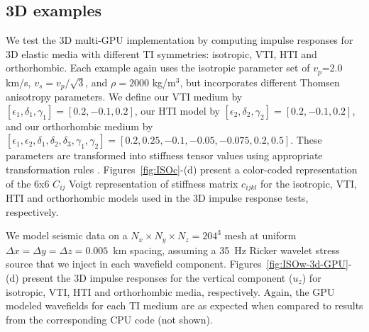 
\subsection{3D examples}

We test the 3D multi-GPU implementation by computing impulse responses for 3D elastic media with different TI symmetries: isotropic, VTI, HTI and orthorhombic.  Each example again uses the isotropic parameter set of $v_p$=2.0 km/s, $v_s=v_p/\sqrt{3}$, and $\rho=2000$ kg/m$^3$, but incorporates different Thomsen anisotropy parameters.  We define our VTI medium by $[\epsilon_1,\delta_1,\gamma_1]=[0.2,-0.1,0.2]$,  our HTI model by $[\epsilon_2,\delta_2,\gamma_2]=[0.2,-0.1,0.2]$, and our orthorhombic medium by $[\epsilon_1,\epsilon_2,\delta_1,\delta_2,\delta_3,\gamma_1,\gamma_2]=[0.2, 0.25,-0.1,-0.05,-0.075, 0.2, 0.5]$.  These parameters are transformed into stiffness tensor values using appropriate transformation rules \cite[]{Thomsen86}.  Figures~\ref{fig:ISOc}-(d) present a color-coded representation of the 6x6 $C_{ij}$ Voigt representation of stiffness matrix $c_{ijkl}$ for the isotropic, VTI, HTI and orthorhombic models used in the 3D impulse response tests, respectively.  


We model seismic data on a $N_x \times N_y \times N_z=204^3$ mesh at uniform $\Delta x=\Delta y=\Delta z=0.005$~km spacing, assuming a 35~Hz Ricker wavelet stress source that we inject in each wavefield component.  Figures~\ref{fig:ISOw-3d-GPU}-(d) present the 3D impulse responses for the vertical component ($u_z$) for isotropic, VTI, HTI and orthorhombic media, respectively.  Again, the GPU modeled wavefields for each TI medium are as expected when compared to results from the corresponding CPU code (not shown).


